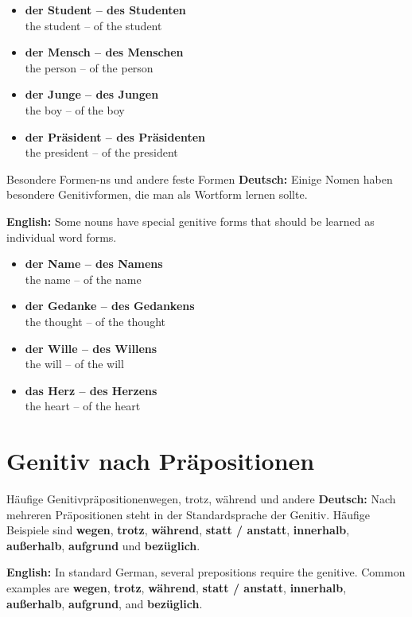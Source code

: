 \documentclass[a4paper,11pt]{article}
\newcommand{\GermanText}[1]{\textbf{Deutsch: }#1\par}
\newcommand{\EnglishText}[1]{{\small\color{SoftGray}\textbf{English: }#1\par}}
\newcommand{\ExampleItem}[2]{\item \textbf{#1}\\{\small\color{SoftGray}#2}}
\begin{document}
        \begin{exbox}
            \begin{itemize}
                \ExampleItem{der Student -- des Studenten}{the student -- of the student}
                \ExampleItem{der Mensch -- des Menschen}{the person -- of the person}
                \ExampleItem{der Junge -- des Jungen}{the boy -- of the boy}
                \ExampleItem{der Präsident -- des Präsidenten}{the president -- of the president}
            \end{itemize}
        \end{exbox}

        \begin{grammarentry}{Besondere Formen}{-ns und andere feste Formen}
            \GermanText{Einige Nomen haben besondere Genitivformen, die man als Wortform lernen sollte.}
            \EnglishText{Some nouns have special genitive forms that should be learned as individual word forms.}
        \end{grammarentry}

        \begin{exbox}
            \begin{itemize}
                \ExampleItem{der Name -- des Namens}{the name -- of the name}
                \ExampleItem{der Gedanke -- des Gedankens}{the thought -- of the thought}
                \ExampleItem{der Wille -- des Willens}{the will -- of the will}
                \ExampleItem{das Herz -- des Herzens}{the heart -- of the heart}
            \end{itemize}
        \end{exbox}

    \section{Genitiv nach Präpositionen}

        \begin{grammarentry}{Häufige Genitivpräpositionen}{wegen, trotz, während und andere}
            \GermanText{Nach mehreren Präpositionen steht in der Standardsprache der Genitiv. Häufige Beispiele sind \textbf{wegen}, \textbf{trotz}, \textbf{während}, \textbf{statt / anstatt}, \textbf{innerhalb}, \textbf{außerhalb}, \textbf{aufgrund} und \textbf{bezüglich}.}
            \EnglishText{In standard German, several prepositions require the genitive. Common examples are \textbf{wegen}, \textbf{trotz}, \textbf{während}, \textbf{statt / anstatt}, \textbf{innerhalb}, \textbf{außerhalb}, \textbf{aufgrund}, and \textbf{bezüglich}.}
        \end{grammarentry}
\end{document}
